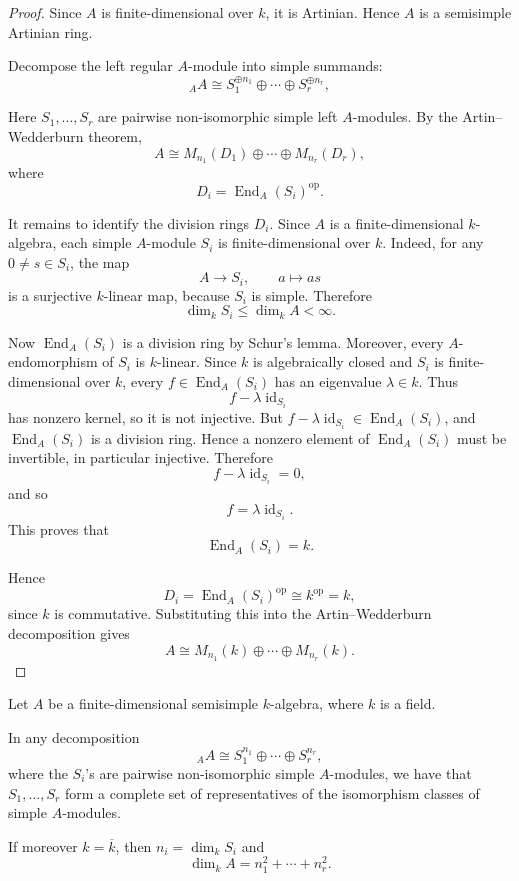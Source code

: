 \begin{proof}
    Since \(A\) is finite-dimensional over \(k\), it is Artinian. Hence \(A\) is a
    semisimple Artinian ring.

    Decompose the left regular \(A\)-module into simple summands:
    \[
        {}_A A
        \cong
        S_1^{\oplus n_1}\oplus \cdots \oplus S_r^{\oplus n_r},
    \]

    Here \(S_1,\dots,S_r\) are pairwise non-isomorphic simple left \(A\)-modules.
    By the Artin--Wedderburn theorem,
    \[
        A
        \cong
        M_{n_1}(D_1)\oplus \cdots \oplus M_{n_r}(D_r),
    \]
    where
    \[
        D_i=\operatorname{End}_A(S_i)^{\operatorname{op}}.
    \]

    It remains to identify the division rings \(D_i\). Since \(A\) is a
    finite-dimensional \(k\)-algebra, each simple \(A\)-module \(S_i\) is finite-dimensional
    over \(k\). Indeed, for any \(0\neq s\in S_i\), the map
    \[
        A\longrightarrow S_i,\qquad a\longmapsto as
    \]
    is a surjective \(k\)-linear map, because \(S_i\) is simple. Therefore
    \[
        \dim_k S_i\leq \dim_k A<\infty.
    \]

    Now \(\operatorname{End}_A(S_i)\) is a division ring by Schur's lemma. Moreover,
    every \(A\)-endomorphism of \(S_i\) is \(k\)-linear. Since \(k\) is algebraically
    closed and \(S_i\) is finite-dimensional over \(k\), every
    \(f\in \operatorname{End}_A(S_i)\) has an eigenvalue \(\lambda\in k\). Thus
    \[
        f-\lambda\operatorname{id}_{S_i}
    \]
    has nonzero kernel, so it is not injective. But
    \(f-\lambda\operatorname{id}_{S_i}\in \operatorname{End}_A(S_i)\), and
    \(\operatorname{End}_A(S_i)\) is a division ring. Hence a nonzero element of
    \(\operatorname{End}_A(S_i)\) must be invertible, in particular injective. Therefore
    \[
        f-\lambda\operatorname{id}_{S_i}=0,
    \]
    and so
    \[
        f=\lambda\operatorname{id}_{S_i}.
    \]
    This proves that
    \[
        \operatorname{End}_A(S_i)=k.
    \]

    Hence
    \[
        D_i=\operatorname{End}_A(S_i)^{\operatorname{op}}
        \cong k^{\operatorname{op}}=k,
    \]
    since \(k\) is commutative. Substituting this into the Artin--Wedderburn
    decomposition gives
    \[
        A
        \cong
        M_{n_1}(k)\oplus \cdots \oplus M_{n_r}(k).
    \]
\end{proof}

\begin{corollary}
    Let $A$ be a finite-dimensional semisimple $k$-algebra, where $k$ is a field.

    In any decomposition
    \[
        {}_A A \cong S_1^{n_1} \oplus \cdots \oplus S_r^{n_r},
    \]
    where the $S_i$'s are pairwise non-isomorphic simple $A$-modules, we have that
    $S_1,\dots,S_r$ form a complete set of representatives of the isomorphism classes
    of simple $A$-modules.

    If moreover $k=\overline{k}$, then $n_i=\dim_k S_i$ and
    \[
        \dim_k A = n_1^2+\cdots+n_r^2.
    \]
\end{corollary}

